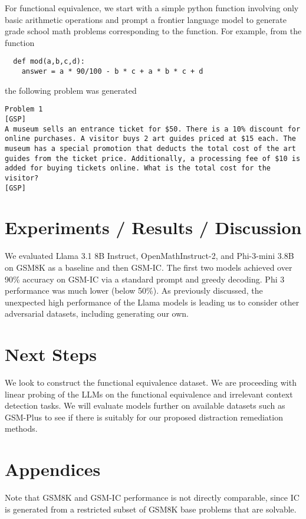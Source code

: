 \documentclass{article}
\begin{document}
For functional equivalence, we start with a simple python function involving only basic arithmetic operations and prompt a frontier language model to generate grade school math problems corresponding to the function. For example, from the function 
\begin{center}
\begin{verbatim}
  def mod(a,b,c,d):
    answer = a * 90/100 - b * c + a * b * c + d
\end{verbatim}
\end{center}
the following problem was generated 
\begin{verbatim}
Problem 1
[GSP]  
A museum sells an entrance ticket for $50. There is a 10% discount for
online purchases. A visitor buys 2 art guides priced at $15 each. The 
museum has a special promotion that deducts the total cost of the art
guides from the ticket price. Additionally, a processing fee of $10 is
added for buying tickets online. What is the total cost for the visitor?  
[GSP] 
\end{verbatim}


\section{Experiments / Results / Discussion}
We evaluated Llama 3.1 8B Instruct, OpenMathInstruct-2, and Phi-3-mini 3.8B on GSM8K as a baseline and then GSM-IC. The first two models achieved over 90\% accuracy on GSM-IC via a standard prompt and greedy decoding. Phi 3 performance was much lower (below 50\%). As previously discussed, the unexpected high performance of the Llama models is leading us to consider other adversarial datasets, including generating our own.


\section{Next Steps}
We look to construct the functional equivalence dataset. We are proceeding with linear probing of the LLMs on the functional equivalence and irrelevant context detection tasks. We will evaluate models further on available datasets such as GSM-Plus to see if there is suitably for our proposed distraction remediation methods.

\section{Appendices} Note that GSM8K and GSM-IC performance is not directly comparable, since IC is generated from a restricted subset of GSM8K base problems that are solvable.
\end{document}
